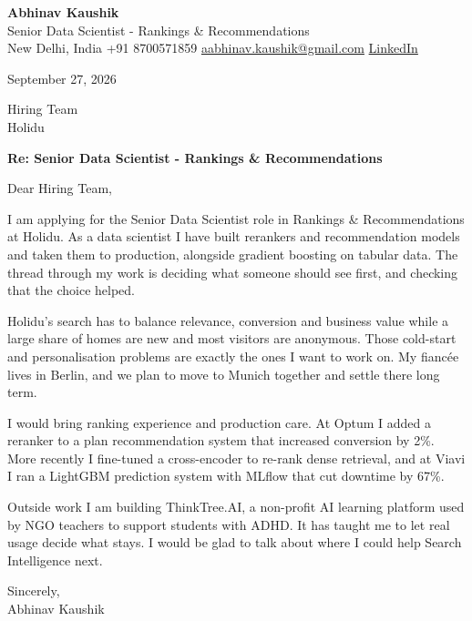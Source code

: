 \documentclass[11pt,a4paper]{article}
\begin{document}
{\Large\bfseries Abhinav Kaushik}\\
Senior Data Scientist - Rankings \& Recommendations\\
New Delhi, India \textbar{} +91 8700571859 \textbar{} \href{mailto:aabhinav.kaushik@gmail.com}{aabhinav.kaushik@gmail.com} \textbar{} \href{https://www.linkedin.com/in/abhinav-kaushik10/}{LinkedIn}  

September 27, 2026

Hiring Team\\
Holidu

\textbf{Re: Senior Data Scientist - Rankings \& Recommendations}

Dear Hiring Team,

I am applying for the Senior Data Scientist role in Rankings \& Recommendations at Holidu. As a data scientist I have built rerankers and recommendation models and taken them to production, alongside gradient boosting on tabular data. The thread through my work is deciding what someone should see first, and checking that the choice helped.

Holidu's search has to balance relevance, conversion and business value while a large share of homes are new and most visitors are anonymous. Those cold-start and personalisation problems are exactly the ones I want to work on. My fiancée lives in Berlin, and we plan to move to Munich together and settle there long term.

I would bring ranking experience and production care. At Optum I added a reranker to a plan recommendation system that increased conversion by 2\%. More recently I fine-tuned a cross-encoder to re-rank dense retrieval, and at Viavi I ran a LightGBM prediction system with MLflow that cut downtime by 67\%.

Outside work I am building ThinkTree.AI, a non-profit AI learning platform used by NGO teachers to support students with ADHD. It has taught me to let real usage decide what stays. I would be glad to talk about where I could help Search Intelligence next.

Sincerely,\\[4pt]
Abhinav Kaushik
\end{document}

